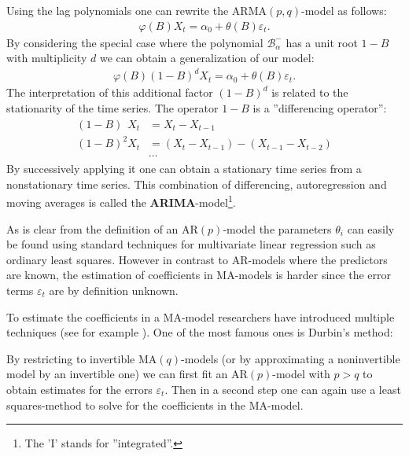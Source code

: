     Using the lag polynomials one can rewrite the ARMA$(p, q)$-model as follows:
    \begin{gather}
        \varphi(B)X_t = \alpha_0 + \theta(B)\varepsilon_t.
    \end{gather}
    By considering the special case where the polynomial $\mathcal{B}^-_\alpha$ has a unit root $1-B$ with multiplicity $d$ we can obtain a generalization of our model:
    \begin{gather}
        \varphi(B)(1-B)^dX_t = \alpha_0 + \theta(B)\varepsilon_t.
    \end{gather}
    The interpretation of this additional factor $(1-B)^d$ is related to the stationarity of the time series. The operator $1-B$ is a ''differencing operator'':
    \begin{align*}
        (1-B)\phantom{^2}X_t &= X_t - X_{t-1}\\
        (1-B)^2X_t &= (X_t-X_{t-1}) - (X_{t-1}-X_{t-2})\\
        &\cdots
    \end{align*}
    By successively applying it one can obtain a stationary time series from a nonstationary time series. This combination of differencing, autoregression and moving averages is called the \textbf{ARIMA}-model\footnote{The 'I' stands for ''integrated''.}.


    \begin{remark}
        As is clear from the definition of an AR$(p)$-model the parameters $\theta_i$ can easily be found using standard techniques for multivariate linear regression such as ordinary least squares. However in contrast to AR-models where the predictors are known, the estimation of coefficients in MA-models is harder since the error terms $\varepsilon_t$ are by definition unknown.
    \end{remark}
    To estimate the coefficients in a MA-model researchers have introduced multiple techniques (see for example \cite{MA_fit}). One of the most famous ones is Durbin's method:
    \begin{method}[Durbin]
        By restricting to invertible MA$(q)$-models (or by approximating a noninvertible model by an invertible one) we can first fit an AR$(p)$-model with $p>q$ to obtain estimates for the errors $\varepsilon_t$. Then in a second step one can again use a least squares-method to solve for the coefficients in the MA-model.
    \end{method}

